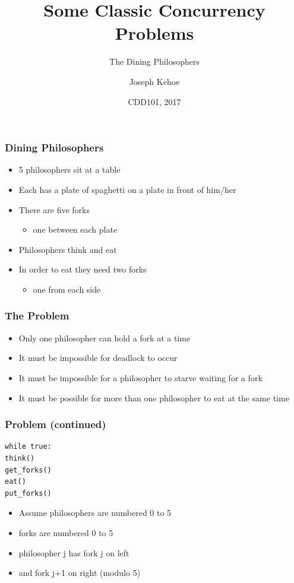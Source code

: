 \documentclass{beamer}
\title[Concurrency] %
{Some Classic Concurrency Problems}
\subtitle{The Dining Philosophers}
\author[Dr. Joseph Kehoe] %
{Joseph Kehoe\inst{1}}
\institute[IT Carlow] %
{
	\inst{1}%
	Department of Computing and Networking\\
	Institute of Technology Carlow
}
\date[ITC 2017] %
{CDD101, 2017}
\begin{document}
 
\frame{\titlepage}
 
 

\begin{frame}
\frametitle{Dining Philosophers}
\begin{itemize}
\item 5 philosophers sit at a table
\item Each has a plate of spaghetti on a plate in front of him/her
\item There are five forks
	\begin{itemize}
	\item one between each plate
	\end{itemize}
\item Philosophers think and eat
\item In order to eat they need two forks
	\begin{itemize}
	\item one from each side
	\end{itemize}
\end{itemize}
\end{frame}


\begin{frame}[fragile]
\frametitle{The Problem}
\begin{itemize}
\item Only one philosopher can hold a fork at a time
\item It must be impossible for deadlock to occur
\item It must be impossible for a philosopher to starve waiting for a fork
\item It must be possible for more than one philosopher to eat at the same time
\end{itemize}
\end{frame}


\begin{frame}[fragile]
	\frametitle{Problem (continued)}
\begin{verbatim}
while true:
think()
get_forks()
eat()
put_forks()
\end{verbatim}
\begin{itemize}
\item Assume philosophers are numbered 0 to 5
\item forks are numbered 0 to 5
\item philosopher j has fork j on left
\item and fork j+1 on right (modulo 5)
\end{itemize}
\end{frame}
\end{document}
